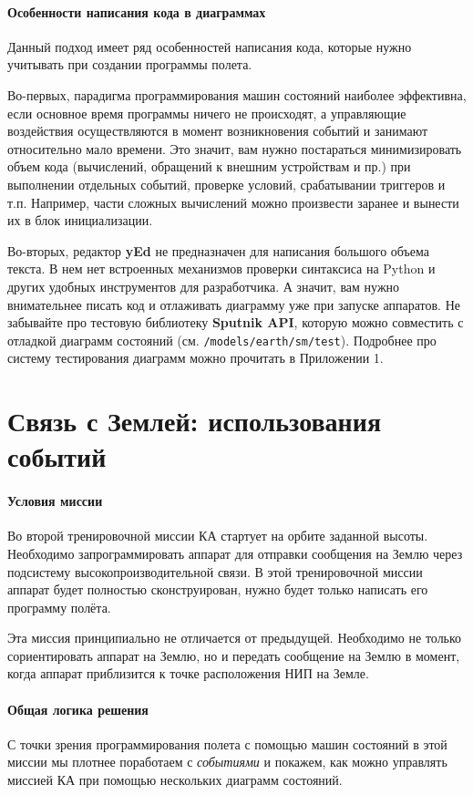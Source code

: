 \documentclass[12pt,a4paper]{article}
\begin{document}
\paragraph{Особенности написания кода в диаграммах} Данный подход имеет ряд особенностей
написания кода, которые нужно учитывать при создании программы полета.

Во-первых, парадигма программирования машин состояний наиболее эффективна, если основное
время программы ничего не происходят, а управляющие воздействия осуществляются в момент
возникновения событий и занимают относительно мало времени. Это значит, вам нужно
постараться минимизировать объем кода (вычислений, обращений к внешним устройствам и пр.)
при выполнении отдельных событий, проверке условий, срабатывании триггеров и
т.п. Например, части сложных вычислений можно произвести заранее и вынести их в блок
инициализации.

Во-вторых, редактор \textbf{yEd} не предназначен для написания большого объема текста. В нем нет
встроенных механизмов проверки синтаксиса на Python и других удобных инструментов для
разработчика. А значит, вам нужно внимательнее писать код и отлаживать диаграмму уже  при
запуске аппаратов. Не забывайте про тестовую библиотеку \textbf{Sputnik API}, которую
можно совместить с отладкой диаграмм состояний
(см. \verb'/models/earth/sm/test'). Подробнее про систему тестирования диаграмм можно
прочитать в Приложении 1.

\clearpage
\section{Связь с Землей: использования событий}

\paragraph{Условия миссии} Во второй тренировочной миссии КА стартует на орбите заданной высоты. Необходимо
запрограммировать аппарат для отправки сообщения на Землю через подсистему
высокопроизводительной связи. В этой тренировочной миссии аппарат будет полностью
сконструирован, нужно будет только написать его программу полёта.

Эта миссия принципиально не отличается от предыдущей. Необходимо не только сориентировать
аппарат на Землю, но и передать сообщение на Землю в момент, когда аппарат приблизится к
точке расположения НИП на Земле.

\paragraph{Общая логика решения} С точки зрения программирования полета с помощью машин
состояний в этой миссии мы плотнее поработаем с \emph{событиями} и покажем, как можно
управлять миссией КА при помощью нескольких диаграмм состояний.
\end{document}
